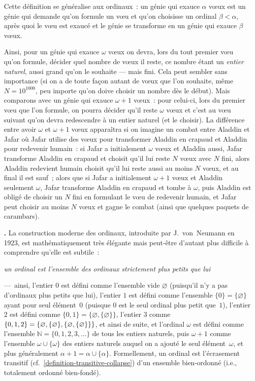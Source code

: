 \documentclass[12pt,a4paper]{article}
\theoremstyle{definition}
\newcommand\thingy{%
\refstepcounter{comcnt}\smallskip\noindent\textbf{\thecomcnt.} }
\begin{document}
Cette définition se généralise aux ordinaux : un génie qui exauce
$\alpha$ vœux est un génie qui demande qu'on formule un vœu et qu'on
choisisse un ordinal $\beta < \alpha$, après quoi le vœu est exaucé et
le génie se transforme en un génie qui exauce $\beta$ vœux.

Ainsi, pour un génie qui exauce $\omega$ vœux on devra, lors du tout
premier vœu qu'on formule, décider quel nombre de vœux il reste, ce
nombre étant un \emph{entier naturel}, aussi grand qu'on le souhaite —
mais fini.  Cela peut sembler sans importance (si on a de toute façon
autant de vœux que l'on souhaite, même $N = 10^{1000}$, peu importe
qu'on doive choisir un nombre dès le début).  Mais comparons avec un
génie qui exauce $\omega+1$ vœux : pour celui-ci, lors du premier vœu
que l'on formule, on pourra décider qu'il reste $\omega$ vœux et c'est
au vœu suivant qu'on devra redescendre à un entier naturel (et le
choisir).  La différence entre avoir $\omega$ et $\omega+1$ vœux
apparaîtra si on imagine un combat entre Aladdin et Jafar où Jafar
utilise des vœux pour transformer Aladdin en crapaud et Aladdin pour
redevenir humain : si Jafar a initialement $\omega$ vœux et Aladdin
aussi, Jafar transforme Aladdin en crapaud et choisit qu'il lui reste
$N$ vœux avec $N$ fini, alors Aladdin redevient humain choisit qu'il
lui reste aussi au moins $N$ vœux, et au final il est sauf ; alors que
si Jafar a initialement $\omega+1$ vœux et Aladdin seulement $\omega$,
Jafar transforme Aladdin en crapaud et tombe à $\omega$, puis Aladdin
est obligé de choisir un $N$ fini en formulant le vœu de redevenir
humain, et Jafar peut choisir au moins $N$ vœux et gagne le combat
(ainsi que quelques paquets de carambars).

\thingy\label{introduction-von-neumann-ordinals}
La construction moderne des ordinaux, introduite par
J. von Neumann en 1923, est mathématiquement très élégante mais peut-être
d'autant plus difficile à comprendre qu'elle est subtile :
\begin{center}
\emph{un ordinal est l'ensemble des ordinaux strictement plus petits que lui}
\end{center}
— ainsi, l'entier $0$ est défini comme l'ensemble vide $\varnothing$
(puisqu'il n'y a pas d'ordinaux plus petits que lui), l'entier $1$ est
défini comme l'ensemble $\{0\} = \{\varnothing\}$ ayant pour seul
élément $0$ (puisque $0$ est le seul ordinal plus petit que $1$),
l'entier $2$ est défini comme $\{0,1\} =
\{\varnothing,\{\varnothing\}\}$, l'entier $3$ comme $\{0,1,2\} =
\{\varnothing,\{\varnothing\}, \penalty0
\{\varnothing,\{\varnothing\}\}\}$, et ainsi de suite, et l'ordinal
$\omega$ est défini comme l'ensemble $\mathbb{N} = \{0,1,2,3,\ldots\}$
de tous les entiers naturels, puis $\omega+1$ comme l'ensemble $\omega
\cup \{\omega\}$ des entiers naturels auquel on a ajouté le seul
élément $\omega$, et plus généralement $\alpha+1 = \alpha \cup
\{\alpha\}$.  Formellement, un ordinal est l'écrasement transitif
(cf. \ref{definition-transitive-collapse}) d'un ensemble bien-ordonné
(i.e., totalement ordonné bien-fondé).
\end{document}
